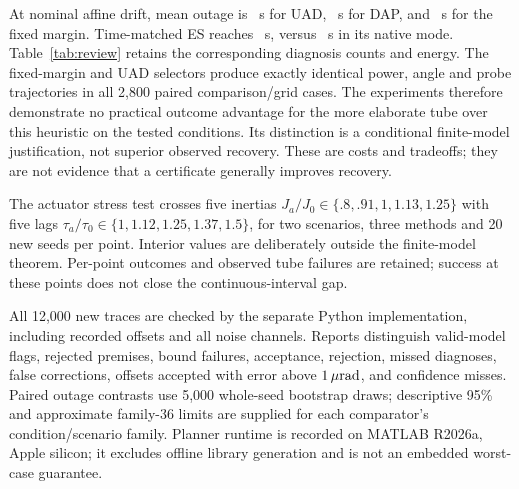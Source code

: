 At nominal affine drift, mean outage is \NewUADDrift~s for UAD, \NewDAPDrift~s for DAP, and \NewGuardDrift~s for the fixed margin. Time-matched ES reaches \NewESDrift~s, versus \NewNativeDrift~s in its native mode. Table~\ref{tab:review} retains the corresponding diagnosis counts and energy. The fixed-margin and UAD selectors produce exactly identical power, angle and probe trajectories in all 2,800 paired comparison/grid cases. The experiments therefore demonstrate no practical outcome advantage for the more elaborate tube over this heuristic on the tested conditions. Its distinction is a conditional finite-model justification, not superior observed recovery. These are costs and tradeoffs; they are not evidence that a certificate generally improves recovery.

The actuator stress test crosses five inertias $J_a/J_0\in\{.8,.91,1,1.13,1.25\}$ with five lags $\tau_a/\tau_0\in\{1,1.12,1.25,1.37,1.5\}$, for two scenarios, three methods and 20 new seeds per point. Interior values are deliberately outside the finite-model theorem. Per-point outcomes and observed tube failures are retained; success at these points does not close the continuous-interval gap.

All 12,000 new traces are checked by the separate Python implementation, including recorded offsets and all noise channels. Reports distinguish valid-model flags, rejected premises, bound failures, acceptance, rejection, missed diagnoses, false corrections, offsets accepted with error above $1\,\mu\mathrm{rad}$, and confidence misses. Paired outage contrasts use 5,000 whole-seed bootstrap draws; descriptive 95\% and approximate family-36 limits are supplied for each comparator's condition/scenario family. Planner runtime is recorded on MATLAB R2026a, Apple silicon; it excludes offline library generation and is not an embedded worst-case guarantee.
